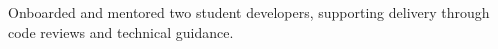 Onboarded and mentored two student developers, supporting delivery through code reviews and technical guidance.
